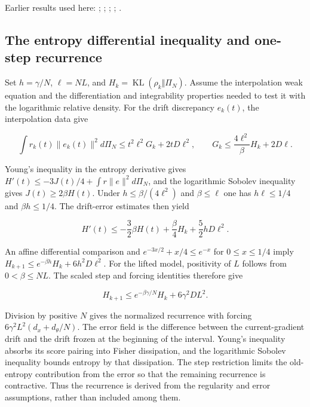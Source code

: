 \documentclass[11pt,a4paper]{report}
\begin{document}
Earlier results used here: \cite[Section~3.26.3]{LangevinLean2026ULASC}; \cite[Section~3.1.3]{LangevinLean2026ULALSI}; \cite[Section~3.34.1]{LangevinLean2026ULALSI}; \cite[Section~3.1.1]{LangevinLean2026IPLA}; \cite[Section~3.3.2]{LangevinLean2026IPLA}.
\subsection{\texorpdfstring{The entropy differential inequality and one-step recurrence}{The entropy differential inequality and one-step recurrence}}
\label{report-step-IPLA-LSI-Theorem-lean-3}


Set \(h=\gamma/N\), \(\ell=NL\), and \(H_k=\operatorname{KL}(\rho_k\Vert\Pi_N)\). Assume the interpolation weak equation and the differentiation and integrability properties needed to test it with the logarithmic relative density. For the drift discrepancy \(e_k(t)\), the interpolation data give

\[\int r_k(t)\|e_k(t)\|^2d\Pi_N\le t^2\ell^2G_k+2tD\ell^2,\qquad G_k\le\frac{4\ell^2}{\beta}H_k+2D\ell.\]

Young’s inequality in the entropy derivative gives \(H'(t)\le-3J(t)/4+\int r\|e\|^2d\Pi_N\), and the logarithmic Sobolev inequality gives \(J(t)\ge2\beta H(t)\). Under \(h\le\beta/(4\ell^2)\) and \(\beta\le\ell\) one has \(h\ell\le1/4\) and \(\beta h\le1/4\). The drift-error estimates then yield

\[H'(t)\le-\frac32\beta H(t)+\frac\beta4H_k+\frac52hD\ell^2.\]

An affine differential comparison and \(e^{-3x/2}+x/4\le e^{-x}\) for \(0\le x\le1/4\) imply \(H_{k+1}\le e^{-\beta h}H_k+6h^2D\ell^2\). For the lifted model, positivity of \(L\) follows from \(0<\beta\le NL\). The scaled step and forcing identities therefore give

\[H_{k+1}\le e^{-\beta\gamma/N}H_k+6\gamma^2DL^2.\]

Division by positive \(N\) gives the normalized recurrence with forcing \(6\gamma^2L^2(d_x+d_\theta/N)\). The error field is the difference between the current-gradient drift and the drift frozen at the beginning of the interval. Young’s inequality absorbs its score pairing into Fisher dissipation, and the logarithmic Sobolev inequality bounds entropy by that dissipation. The step restriction limits the old-entropy contribution from the error so that the remaining recurrence is contractive. Thus the recurrence is derived from the regularity and error assumptions, rather than included among them.
\end{document}
